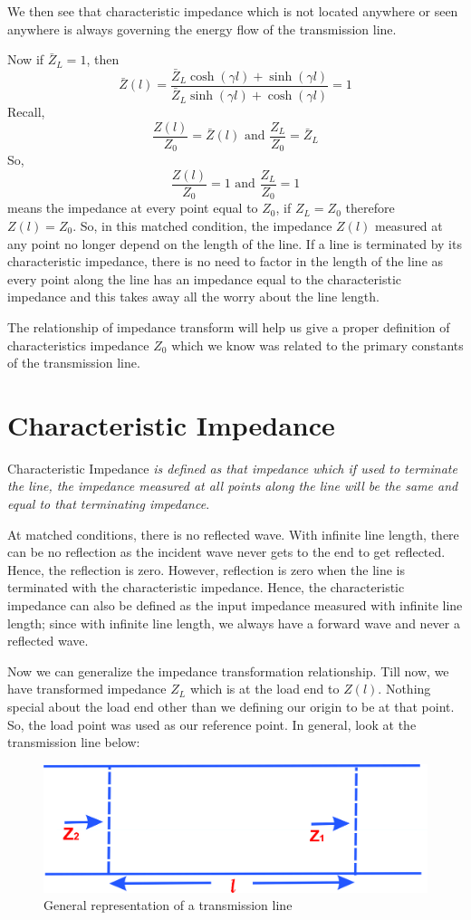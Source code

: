 We then see that characteristic impedance which is not located anywhere or seen anywhere is always governing the energy flow of the transmission line.

Now if $\bar{Z}_L = 1$, then 
\begin{dmath*}
\bar{Z}(l) = {\frac{\bar{Z}_L\cosh(\gamma l) + \sinh(\gamma l)}{\bar{Z}_L\sinh(\gamma l) + \cosh(\gamma l)}} = 1
\end{dmath*}
Recall,
\[\frac{Z(l)}{Z_0} = \bar{Z}(l)\text{ and }\frac{Z_L}{Z_0} = \bar{Z}_L\]
So,
\[\frac{Z(l)}{Z_0} = 1\text{ and }\frac{Z_L}{Z_0} = 1
\]
means the impedance at every point equal to $Z_0$, if $Z_L = Z_0$ therefore $Z(l) = Z_0$. So, in this matched condition, the impedance $Z(l)$ measured at any point no longer depend on the length of the line. If a line is terminated by its characteristic impedance, there is no need to factor in the length of the line as every point along the line has an impedance equal to the characteristic impedance and this takes away all the worry about the line length.

The relationship of impedance transform will help us give a proper definition of characteristics impedance $Z_0$ which we know was related to the primary constants of the transmission line.

\section{Characteristic Impedance}  
Characteristic Impedance \emph{is defined as that impedance which if used to terminate the line, the impedance measured at all points along the line will be the same and equal to that terminating impedance}.

At matched conditions, there is no reflected wave. With infinite line length, there can be no reflection as the incident wave never gets to the end to get reflected. Hence, the reflection is zero. However, reflection is zero when the line is terminated with the characteristic impedance. Hence, the characteristic impedance can also be defined as the input impedance measured with infinite line length; since with infinite line length, we always have a forward wave and never a reflected wave.

Now we can generalize the impedance transformation relationship. Till now, we have transformed impedance $Z_L$ which is at the load end to $Z(l)$. Nothing special about the load end other than we defining our origin to be at that point. So, the load point was used as our reference point. In general, look at the transmission line below:
\begin{figure}[h]
\centering
\includegraphics[scale=0.45]{./graphics/1234}
\caption{General representation of a transmission line}
\end{figure}


